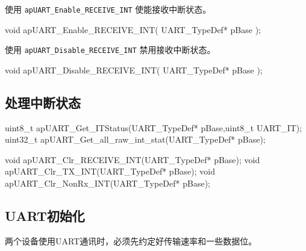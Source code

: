 \documentclass[
  12pt,
]{book}
\newenvironment{Shaded}{\begin{snugshade}}{\end{snugshade}}
\newcommand{\DataTypeTok}[1]{\textcolor[rgb]{0.13,0.29,0.53}{#1}}
\newcommand{\NormalTok}[1]{#1}
\begin{document}
使用 \texttt{apUART\_Enable\_RECEIVE\_INT} 使能接收中断状态。

\begin{Shaded}
\begin{Highlighting}[]
\DataTypeTok{void}\NormalTok{ apUART_Enable_RECEIVE_INT(}
\NormalTok{  UART_TypeDef* pBase}
\NormalTok{  );}
\end{Highlighting}
\end{Shaded}

使用 \texttt{apUART\_Disable\_RECEIVE\_INT} 禁用接收中断状态。

\begin{Shaded}
\begin{Highlighting}[]
\DataTypeTok{void}\NormalTok{ apUART_Disable_RECEIVE_INT(}
\NormalTok{  UART_TypeDef* pBase}
\NormalTok{  );}
\end{Highlighting}
\end{Shaded}

\hypertarget{ux5904ux7406ux4e2dux65adux72b6ux6001-2}{%
\subsection{处理中断状态}\label{ux5904ux7406ux4e2dux65adux72b6ux6001-2}}

uint8\_t apUART\_Get\_ITStatus(UART\_TypeDef* pBase,uint8\_t UART\_IT);
uint32\_t apUART\_Get\_all\_raw\_int\_stat(UART\_TypeDef* pBase);

void apUART\_Clr\_RECEIVE\_INT(UART\_TypeDef* pBase);
void apUART\_Clr\_TX\_INT(UART\_TypeDef* pBase);
void apUART\_Clr\_NonRx\_INT(UART\_TypeDef* pBase);

\hypertarget{uartux521dux59cbux5316}{%
\subsection{UART初始化}\label{uartux521dux59cbux5316}}

两个设备使用UART通讯时，必须先约定好传输速率和一些数据位。
\end{document}
